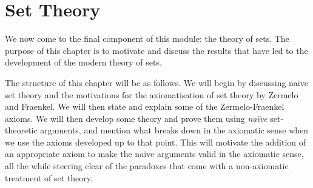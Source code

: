 \chapter{Set Theory}
\thispagestyle{empty}

We now come to the final component of this module: the theory of sets. The purpose of this chapter is to motivate and discuss the results that have led to the development of the modern theory of sets.

The structure of this chapter will be as follows. We will begin by discussing naïve set theory and the motivations for the axiomatisation of set theory by Zermelo and Fraenkel. We will then state and explain some of the Zermelo-Fraenkel axioms. We will then develop some theory and prove them using \textit{naïve} set-theoretic arguments, and mention what breaks down in the axiomatic sense when we use the axioms developed up to that point. This will motivate the addition of an appropriate axiom to make the naïve arguments valid in the axiomatic sense, all the while steering clear of the paradoxes that come with a non-axiomatic treatment of set theory.





